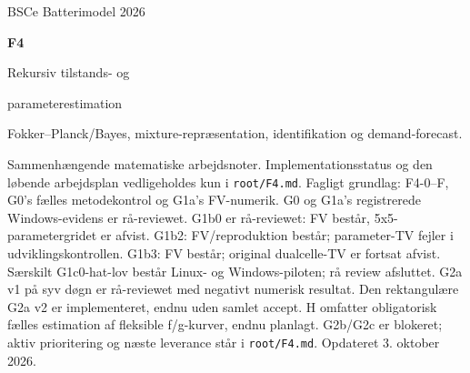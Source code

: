 \documentclass[11pt,a4paper]{article}
\numberwithin{equation}{section}
\begin{document}
\hypersetup{pageanchor=false}
\begin{titlepage}
\vspace*{20mm}
{\Large BSCe Batterimodel 2026\par}
\vspace{20mm}
{\Huge\bfseries F4\par}
\vspace{6mm}
{\LARGE Rekursiv tilstands- og\par parameterestimation\par}
\vspace{12mm}
Fokker--Planck/Bayes, mixture-repræsentation, identifikation og demand-forecast.

Sammenhængende matematiske arbejdsnoter. Implementationsstatus og den løbende
arbejdsplan vedligeholdes kun i \texttt{root/F4.md}.
\vfill
Fagligt grundlag: F4-0--F, G0's fælles metodekontrol og G1a's FV-numerik.
G0 og G1a's registrerede Windows-evidens er rå-reviewet.
G1b0 er rå-reviewet: FV består, 5x5-parametergridet er afvist.
G1b2: FV/reproduktion består; parameter-TV fejler i udviklingskontrollen.
G1b3: FV består; original dualcelle-TV er fortsat afvist.
Særskilt G1c0-hat-lov består Linux- og Windows-piloten; rå review afsluttet.
G2a v1 på syv døgn er rå-reviewet med negativt numerisk resultat.
Den rektangulære G2a v2 er implementeret, endnu uden samlet accept.
H omfatter obligatorisk fælles estimation af fleksible f/g-kurver, endnu planlagt.
G2b/G2c er blokeret; aktiv prioritering og næste leverance står i
\texttt{root/F4.md}. Opdateret 3. oktober 2026.
\end{titlepage}
\hypersetup{pageanchor=true}
\tableofcontents
\clearpage
{}

\end{document}
